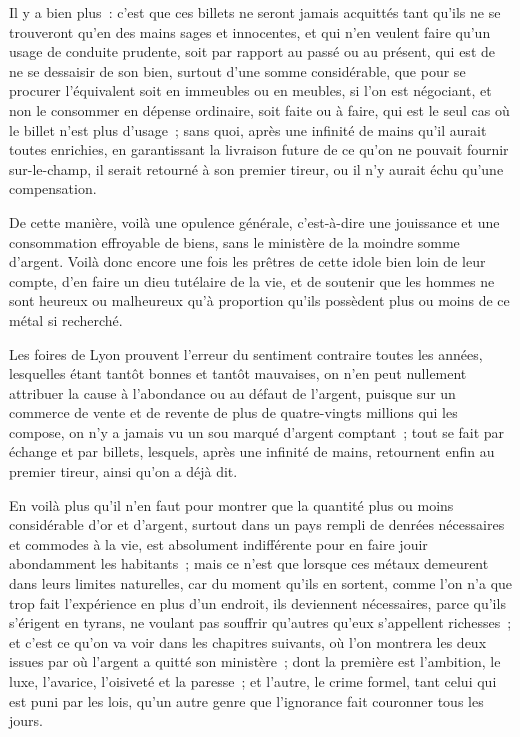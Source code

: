 \documentclass[french,twoside]{book} %
\begin{document}
Il y a bien plus : c’est que ces billets ne seront jamais acquittés tant qu’ils ne se trouveront qu’en des mains sages et innocentes, et qui n’en veulent faire qu’un usage de conduite prudente, soit par rapport au passé ou au présent, qui est de ne se dessaisir de son bien, surtout d’une somme considérable, que pour se procurer l’équivalent soit en immeubles ou en meubles, si l’on est négociant, et non le consommer en dépense ordinaire, soit faite ou à faire, qui est le seul cas où le billet n’est plus d’usage ; sans quoi, après une infinité de mains qu’il aurait toutes enrichies, en garantissant la livraison future de ce qu’on ne pouvait fournir sur-le-champ, il serait retourné à son premier tireur, ou il n’y aurait échu qu’une compensation.\par
De cette manière, voilà une opulence générale, c’est-à-dire une jouissance et une consommation effroyable de biens, sans le ministère de la moindre somme d’argent. Voilà donc encore une fois les prêtres de cette idole bien loin de leur compte, d’en faire un dieu tutélaire de la vie, et de soutenir que les hommes ne sont heureux ou malheureux qu’à proportion qu’ils possèdent plus ou moins de ce métal si recherché.\par
Les foires de Lyon prouvent l’erreur du sentiment contraire toutes les années, lesquelles étant tantôt bonnes et tantôt mauvaises, on n’en peut nullement attribuer la cause à l’abondance ou au défaut de l’argent, puisque sur un commerce de vente et de revente de plus de quatre-vingts millions qui les compose, on n’y a jamais vu un sou marqué d’argent comptant ; tout se fait par échange et par billets, lesquels, après une infinité de mains, retournent enfin au premier tireur, ainsi qu’on a déjà dit.\par
En voilà plus qu’il n’en faut pour montrer que la quantité plus ou moins considérable d’or et d’argent, surtout dans un pays rempli de denrées nécessaires et commodes à la vie, est absolument indifférente pour en faire jouir abondamment les habitants ; mais ce n’est que lorsque ces métaux demeurent dans leurs limites naturelles, car du moment qu’ils en sortent, comme l’on n’a que trop fait l’expérience en plus d’un endroit, ils deviennent nécessaires, parce qu’ils s’érigent en tyrans, ne voulant pas souffrir qu’autres qu’eux s’appellent richesses ; et c’est ce qu’on va voir dans les chapitres suivants, où l’on montrera les deux issues par où l’argent a quitté son ministère ; dont la première est l’ambition, le luxe, l’avarice, l’oisiveté et la paresse ; et l’autre, le crime formel, tant celui qui est puni par les lois, qu’un autre genre que l’ignorance fait couronner tous les jours.
\end{document}
